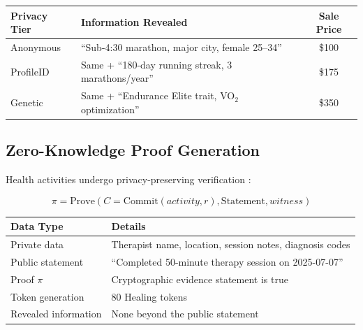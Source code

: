\documentclass[11pt,letterpaper]{article}
\begin{document}

\begin{table}[H]
\centering
\begin{tabular}{p{2cm}p{8cm}c}
\toprule
\textbf{Privacy Tier} & \textbf{Information Revealed} & \textbf{Sale Price} \\
\midrule
Anonymous & ``Sub-4:30 marathon, major city, female 25--34'' & \$100 \\
ProfileID & Same + ``180-day running streak, 3 marathons/year'' & \$175 \\
Genetic & Same + ``Endurance Elite trait, VO$_2$ optimization'' & \$350 \\
\bottomrule
\end{tabular}
\end{table}


\subsection{Zero-Knowledge Proof Generation}

Health activities undergo privacy-preserving verification \cite{groth2016size}:

\begin{equation}
\pi = \text{Prove}\left(C = \text{Commit}(activity, r), \text{Statement}, witness\right)
\end{equation}


\clearpage
{}

\begin{table}[H]
\centering
\begin{tabular}{ll}
\toprule
\textbf{Data Type} & \textbf{Details} \\
\midrule
Private data & Therapist name, location, session notes, diagnosis codes \\
Public statement & ``Completed 50-minute therapy session on 2025-07-07'' \\
Proof $\pi$ & Cryptographic evidence statement is true \\
Token generation & 80 Healing tokens \\
Revealed information & None beyond the public statement \\
\bottomrule
\end{tabular}
\end{table}
\end{document}
